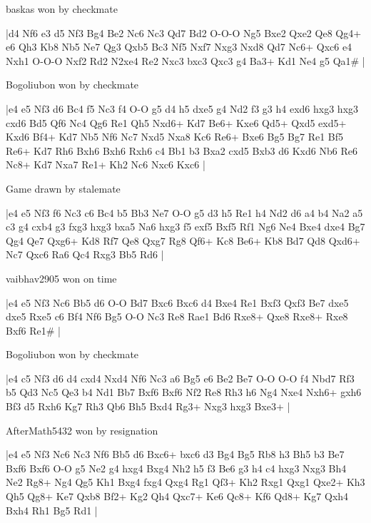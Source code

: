 \showboard

baskas won by checkmate

\makegametitle
|d4 Nf6 e3 d5 Nf3 Bg4 Be2 Nc6 Nc3 Qd7 Bd2 O-O-O Ng5 Bxe2 Qxe2 Qe8 Qg4+ e6 Qh3 Kb8 Nb5 Ne7 Qg3 Qxb5 Bc3 Nf5 Nxf7 Nxg3 Nxd8 Qd7 Nc6+ Qxc6 e4 Nxh1 O-O-O Nxf2 Rd2 N2xe4 Re2 Nxc3 bxc3 Qxc3 g4 Ba3+ Kd1 Ne4 g5 Qa1\#  |

\showboard

Bogoliubon won by checkmate

\makegametitle
|e4 e5 Nf3 d6 Bc4 f5 Nc3 f4 O-O g5 d4 h5 dxe5 g4 Nd2 f3 g3 h4 exd6 hxg3 hxg3 cxd6 Bd5 Qf6 Nc4 Qg6 Re1 Qh5 Nxd6+ Kd7 Be6+ Kxe6 Qd5+ Qxd5 exd5+ Kxd6 Bf4+ Kd7 Nb5 Nf6 Nc7 Nxd5 Nxa8 Kc6 Re6+ Bxe6 Bg5 Bg7 Re1 Bf5 Re6+ Kd7 Rh6 Bxh6 Bxh6 Rxh6 c4 Bb1 b3 Bxa2 cxd5 Bxb3 d6 Kxd6 Nb6 Re6 Nc8+ Kd7 Nxa7 Re1+ Kh2 Nc6 Nxc6 Kxc6  |

\showboard

Game drawn by stalemate

\makegametitle
|e4 e5 Nf3 f6 Nc3 c6 Bc4 b5 Bb3 Ne7 O-O g5 d3 h5 Re1 h4 Nd2 d6 a4 b4 Na2 a5 c3 g4 cxb4 g3 fxg3 hxg3 bxa5 Na6 hxg3 f5 exf5 Bxf5 Rf1 Ng6 Ne4 Bxe4 dxe4 Bg7 Qg4 Qe7 Qxg6+ Kd8 Rf7 Qe8 Qxg7 Rg8 Qf6+ Kc8 Be6+ Kb8 Bd7 Qd8 Qxd6+ Nc7 Qxc6 Ra6 Qc4 Rxg3 Bb5 Rd6  |

\showboard

vaibhav2905 won on time

\makegametitle
|e4 e5 Nf3 Nc6 Bb5 d6 O-O Bd7 Bxc6 Bxc6 d4 Bxe4 Re1 Bxf3 Qxf3 Be7 dxe5 dxe5 Rxe5 c6 Bf4 Nf6 Bg5 O-O Nc3 Re8 Rae1 Bd6 Rxe8+ Qxe8 Rxe8+ Rxe8 Bxf6 Re1\#  |

\showboard

Bogoliubon won by checkmate

\makegametitle
|e4 c5 Nf3 d6 d4 cxd4 Nxd4 Nf6 Nc3 a6 Bg5 e6 Be2 Be7 O-O O-O f4 Nbd7 Rf3 b5 Qd3 Nc5 Qe3 b4 Nd1 Bb7 Bxf6 Bxf6 Nf2 Re8 Rh3 h6 Ng4 Nxe4 Nxh6+ gxh6 Bf3 d5 Rxh6 Kg7 Rh3 Qb6 Bh5 Bxd4 Rg3+ Nxg3 hxg3 Bxe3+  |

\showboard

AfterMath5432 won by resignation

\makegametitle
|e4 e5 Nf3 Nc6 Nc3 Nf6 Bb5 d6 Bxc6+ bxc6 d3 Bg4 Bg5 Rb8 h3 Bh5 b3 Be7 Bxf6 Bxf6 O-O g5 Ne2 g4 hxg4 Bxg4 Nh2 h5 f3 Be6 g3 h4 c4 hxg3 Nxg3 Bh4 Ne2 Rg8+ Ng4 Qg5 Kh1 Bxg4 fxg4 Qxg4 Rg1 Qf3+ Kh2 Rxg1 Qxg1 Qxe2+ Kh3 Qh5 Qg8+ Ke7 Qxb8 Bf2+ Kg2 Qh4 Qxc7+ Ke6 Qc8+ Kf6 Qd8+ Kg7 Qxh4 Bxh4 Rh1 Bg5 Rd1  |

